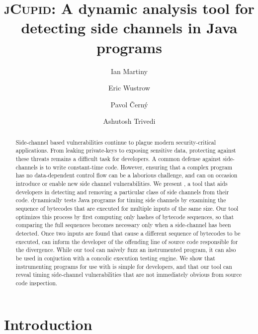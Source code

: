 \documentclass{llncs}
\begin{document}
\title{\textsc{jCupid}: A dynamic analysis tool for detecting side channels in Java programs}
\author{
  Ian Martiny
  \and
  Eric Wustrow
  \and
  Pavol {\v C}ern\'y
  \and
  Ashutosh Trivedi
}


\maketitle

\begin{abstract}
  Side-channel based vulnerabilities continue to plague modern security-critical
  applications.
  From leaking private-keys to exposing sensitive data, 
  protecting against these threats remains a difficult task for developers. 
  A common defense against side-channels is to write constant-time code.
  However, ensuring that a complex program has no data-dependent control flow
  can be a laborious challenge, and can on occasion introduce or enable new side
  channel vulnerabilities.
  We present \jcupid, a tool that aids developers in detecting and
  removing a particular class of side channels from their code.
  \jcupid dynamically tests Java programs for timing side channels by examining
  the sequence of bytecodes that are executed for multiple inputs of the same size.
  Our tool optimizes this process by first computing only hashes of bytecode sequences,
  so that comparing the full sequences becomes necessary only when a side-channel has been detected.
  Once two inputs are found that cause a different sequence of bytecodes to be
  executed, \jcupid can inform the developer of the offending line of source code
  responsible for the divergence.
  While our tool can naively fuzz an instrumented program, it can also be used
  in conjuction with a concolic execution testing engine.
  We show that instrumenting programs for use with \jcupid is simple for
  developers, and that our tool can reveal timing side-channel vulnerabilities
  that are not immediately obvious from source code inspection.
\end{abstract}



\section{Introduction}
\label{sec:introduction}

\end{document}
